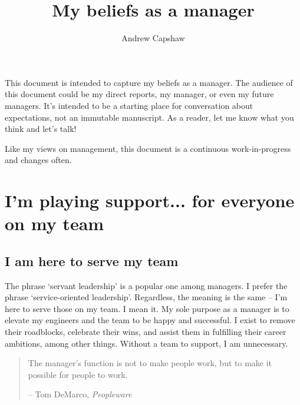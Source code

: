 \documentclass[11pt]{amsart}
\title{My beliefs as a manager}
\author{Andrew Capshaw}
\begin{document}
\thispagestyle{empty}



\maketitle

This document is intended to capture my beliefs as a manager. The audience of this document could be my direct reports, my manager, or even my future managers. It's intended to be a starting place for conversation about expectations, not an immutable manuscript. As a reader, let me know what you think and let's talk! 

Like my views on management, this document is a continuous work-in-progress and changes often.

\section{I'm playing support... for everyone on my team} %
\subsection{I am here to serve my team}
The phrase `servant leadership’ is a popular one among managers. I prefer the phrase `service-oriented leadership'. Regardless, the meaning is the same -- I'm here to serve those on my team. I mean it. My sole purpose as a manager is to elevate my engineers and the team to be happy and successful. I exist to remove their roadblocks, celebrate their wins, and assist them in fulfilling their career ambitions, among other things. Without a team to support, I am unnecessary.

\begin{quote}
The manager’s function is not to make people work, but to make it possible for people to work.

-- Tom DeMarco, \emph{Peopleware}
\end{quote}
\end{document}
